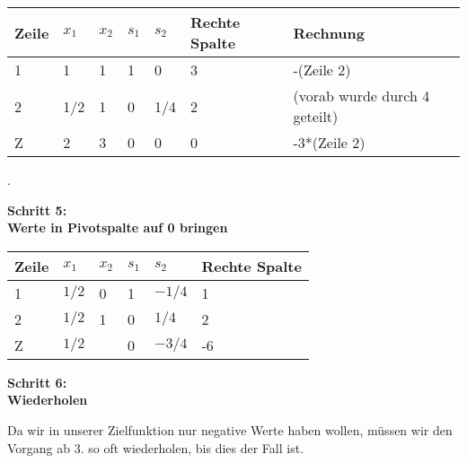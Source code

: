 \begin{table}[h]
\begin{tabular}{|l|l|l|l|l|l|l|}
\hline
\rowcolor[HTML]{C0C0C0} 
Zeile                     & $x_1$  & $x_2$                        & $s_1$ & $s_2$  & Rechte Spalte & Rechnung                      \\ \hline
\cellcolor[HTML]{C0C0C0}1 & 1   & \cellcolor[HTML]{FFFFFF}1 & 1  & 0   & 3             & -(Zeile 2)                    \\ \hline
\rowcolor[HTML]{FFFFFF} 
\cellcolor[HTML]{C0C0C0}2 & 1/2 & \cellcolor[HTML]{68CBD0}1 & 0  & 1/4 & 2             & (vorab wurde durch 4 geteilt) \\ \hline
\cellcolor[HTML]{C0C0C0}Z & 2   & \cellcolor[HTML]{FFFFFF}3 & 0  & 0   & 0             & -3*(Zeile 2)                  \\ \hline
\end{tabular}
\end{table}
.\\
\begin{center}
\textbf{Schritt 5:\\Werte in Pivotspalte auf 0 bringen }\end{center}
\begin{table}[!ht]
\begin{tabular}{|l|l|l|l|l|l|}
\hline
\rowcolor[HTML]{C0C0C0} 
Zeile                     & $x_1$  & $x_2$ & $s_1$ & $s_2$   & Rechte Spalte \\ \hline
\rowcolor[HTML]{FFFFFF} 
\cellcolor[HTML]{C0C0C0}1 & $1/2$ & 0  & 1  & $-1/4$ & 1             \\ \hline
\rowcolor[HTML]{FFFFFF} 
\cellcolor[HTML]{C0C0C0}2 & $1/2$ & 1  & 0  & $1/4$  & 2             \\ \hline
\rowcolor[HTML]{FFFFFF} 
\cellcolor[HTML]{C0C0C0}Z & $1/2$ &    & 0  & $-3/4$ & -6            \\ \hline
\end{tabular}
\end{table}
\begin{center}\textbf{Schritt 6:\\ Wiederholen}\end{center}
Da wir in unserer Zielfunktion nur negative Werte haben wollen, müssen wir den Vorgang ab 3. so oft wiederholen, bis dies der Fall ist.\\
